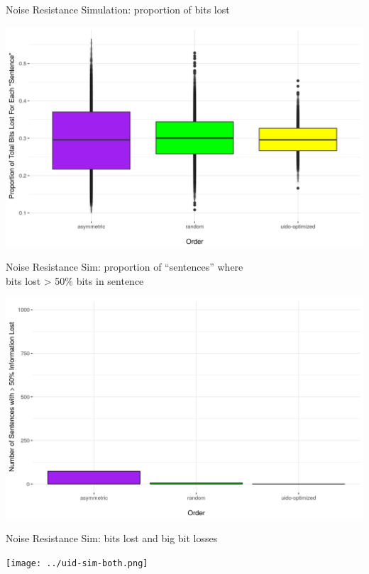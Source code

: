 \documentclass[hyperref={pdfpagelabels=false}]{beamer}
\begin{document}
\begin{frame}{Noise Resistance Simulation: proportion of bits lost} 

\includegraphics[width=1.15\textwidth]{../uid-sim-totalbits.png}


\end{frame}


\begin{frame}{Noise Resistance Sim: proportion of ``sentences'' where \\bits lost > 50\% bits in sentence} 



\includegraphics[width=1.115\textwidth]{../uid-sim-majority.png}

\end{frame}

\begin{frame}{Noise Resistance Sim: bits lost and big bit losses} 


\texttt{[image: ../uid-sim-both.png]}

\end{frame}
\end{document}
